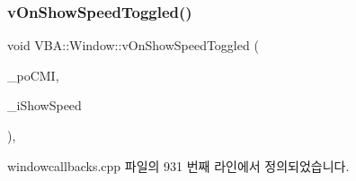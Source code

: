\subsubsection{\texorpdfstring{v\+On\+Show\+Speed\+Toggled()}{vOnShowSpeedToggled()}}
{\footnotesize\ttfamily void V\+B\+A\+::\+Window\+::v\+On\+Show\+Speed\+Toggled (\begin{DoxyParamCaption}\item[{Gtk\+::\+Check\+Menu\+Item $\ast$}]{\+\_\+po\+C\+MI,  }\item[{\mbox{\hyperlink{_util_8cpp_a0ef32aa8672df19503a49fab2d0c8071}{int}}}]{\+\_\+i\+Show\+Speed }\end{DoxyParamCaption})\hspace{0.3cm}{\ttfamily [protected]}, {\ttfamily [virtual]}}



windowcallbacks.\+cpp 파일의 931 번째 라인에서 정의되었습니다.


